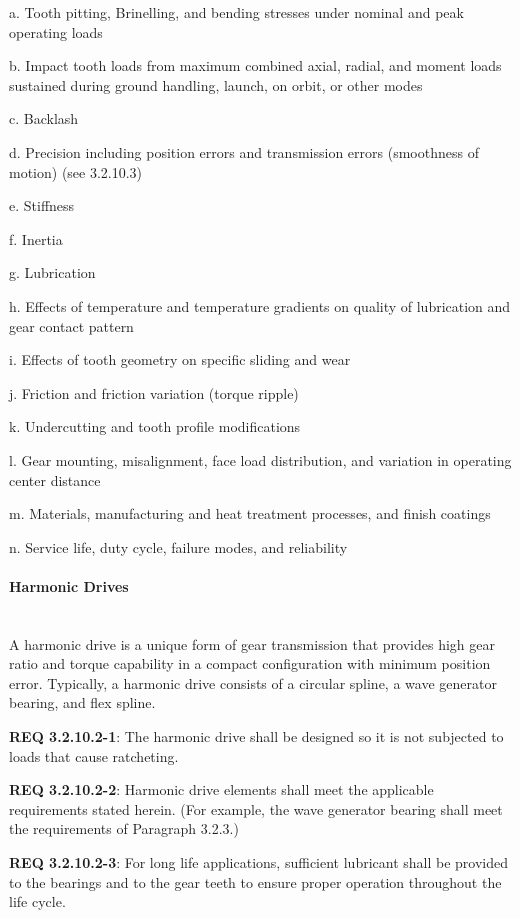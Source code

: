 \documentclass[12pt]{article}
\begin{document}
a. Tooth pitting, Brinelling, and bending stresses under nominal and peak operating loads

b. Impact tooth loads from maximum combined axial, radial, and moment loads sustained during ground handling, launch, on orbit, or other modes

c. Backlash

d. Precision including position errors and transmission errors (smoothness of motion) (see 3.2.10.3)

e. Stiffness

f. Inertia

g. Lubrication

h. Effects of temperature and temperature gradients on quality of lubrication and gear contact pattern

i. Effects of tooth geometry on specific sliding and wear

j. Friction and friction variation (torque ripple)

k. Undercutting and tooth profile modifications

l. Gear mounting, misalignment, face load distribution, and variation in operating center distance

m. Materials, manufacturing and heat treatment processes, and finish coatings

n. Service life, duty cycle, failure modes, and reliability


\paragraph{Harmonic Drives} \mbox{} \\ %
A harmonic drive is a unique form of gear transmission that provides high gear ratio and torque capability in a compact configuration with minimum position error. 
Typically, a harmonic drive consists of a circular spline, a wave generator bearing, and flex spline. 

\noindent \textbf{REQ 3.2.10.2-1}: The harmonic drive shall be designed so it is not subjected to loads that cause ratcheting. 

\noindent \textbf{REQ 3.2.10.2-2}: Harmonic drive elements shall meet the applicable requirements stated herein. 
(For example, the wave generator bearing shall meet the requirements of Paragraph 3.2.3.)

\noindent \textbf{REQ 3.2.10.2-3}: For long life applications, sufficient lubricant shall be provided to the bearings and to the gear teeth to ensure proper operation throughout the life cycle.
\end{document}
